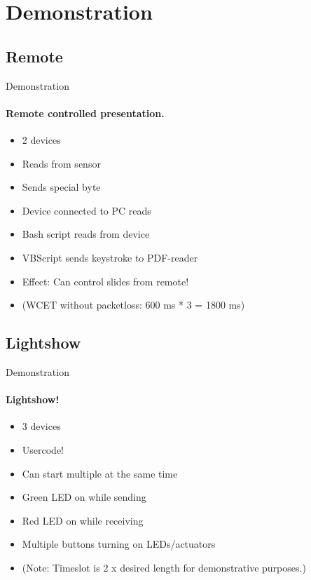 \section{Demonstration}
    \subsection{Remote}
    \begin{frame}[t]{Demonstration}\framesubtitle{Remote controlled presentation.}
        \begin{itemize}
            \item 2 devices
            \item Reads from sensor
            \item Sends special byte
            \item Device connected to PC reads
            \item Bash script reads from device
            \item VBScript sends keystroke to PDF-reader
            \item Effect: Can control slides from remote!
            \item (WCET without packetloss: 600 ms * 3 = 1800 ms)
        \end{itemize}
    \end{frame}
    \subsection{Lightshow}
    \begin{frame}[t]{Demonstration}\framesubtitle{Lightshow!}
        \begin{itemize}
            \item 3 devices
            \item Usercode!
            \item Can start multiple at the same time
            \item Green LED on while sending
            \item Red LED on while receiving
            \item Multiple buttons turning on LEDs/actuators
            \item (Note: Timeslot is 2 x desired length for demonstrative purposes.)
        \end{itemize}
    \end{frame}
